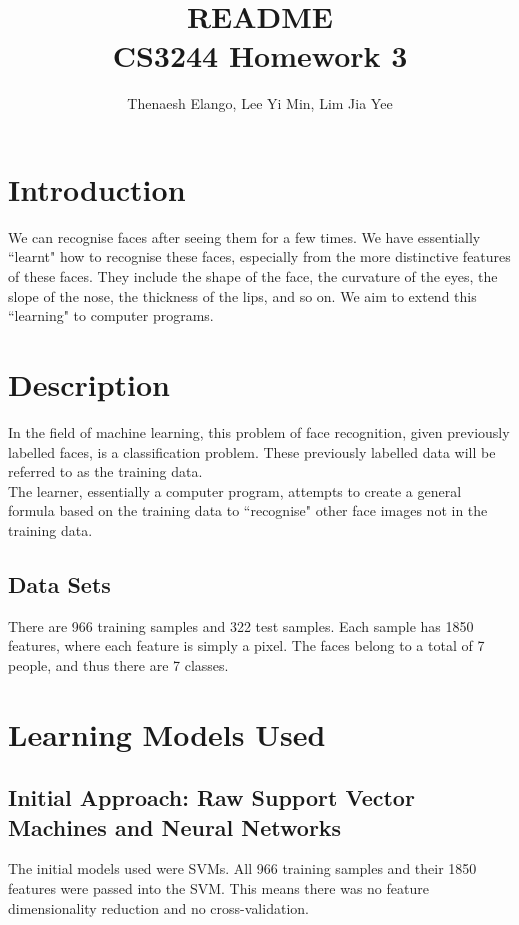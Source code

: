 \documentclass{article}
\title{README \\ CS3244 Homework 3}
\author{Thenaesh Elango, Lee Yi Min, Lim Jia Yee}
\begin{document}
\maketitle
\tableofcontents
\newpage

\section{Introduction}
We can recognise faces after seeing them for a few times. We have essentially ``learnt" how to recognise these faces, especially from the more distinctive features of these faces. They include the shape of the face, the curvature of the eyes, the slope of the nose, the thickness of the lips, and so on. We aim to extend this ``learning" to computer programs.

\section{Description}
In the field of machine learning, this problem of face recognition, given previously labelled faces, is a classification problem. These previously labelled data will be referred to as the training data. \\

The learner, essentially a computer program, attempts to create a general formula based on the training data to ``recognise" other face images not in the training data.

\subsection{Data Sets}
There are 966 training samples and 322 test samples. Each sample has 1850 features, where each feature is simply a pixel. The faces belong to a total of 7 people, and thus there are 7 classes.

\section{Learning Models Used}
\subsection{Initial Approach: Raw Support Vector Machines and Neural Networks}
The initial models used were SVMs. All 966 training samples and their 1850 features were passed into the SVM. This means there was no feature dimensionality reduction and no cross-validation. \\
\end{document}
